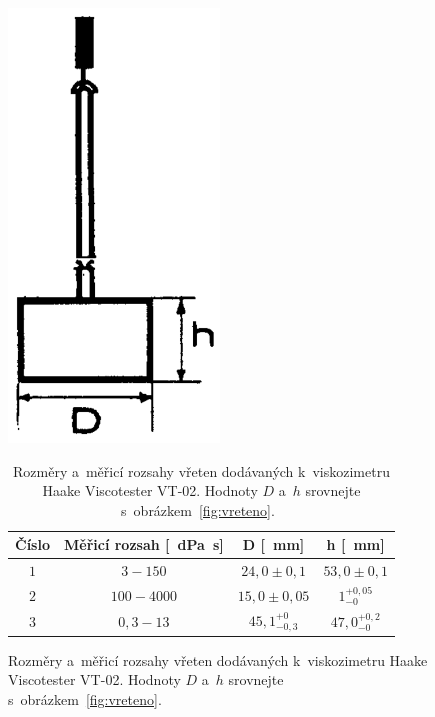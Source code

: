 \documentclass[12pt]{article}
\begin{document}
\begin{figure}[ht]
    \begin{minipage}[b]{0.3\linewidth}
        \centering
        \includegraphics[width=0.5\textwidth]{figures/vreteno.png}
        \caption{Obecný nákres rotačního vřetena.~\cite{man:VT-02}}
        \label{fig:vreteno}
    \end{minipage}
    \hspace{0.5cm}
    \begin{minipage}[b]{0.65\linewidth}
        \begin{table}[H]
            \centering
            \begin{tabular}{|c|c|c|c|}
                \hline
                Číslo & Měřicí rozsah [\SI{}{\deci\pascal\second}] & D [\SI{}{\milli\metre}] & h [\SI{}{\milli\metre}] \\ \hline
                $1$ & $3 - 150$ & $24,0\pm 0,1$ & $53,0\pm0,1$ \\ \hline
                $2$ & $100 - 4000$ & $15,0\pm 0,05$ & $1^{+0,05}_{-0}$ \\ \hline
                $3$ & $0,3 - 13$ & $45,1^{+0}_{-0,3}$ & $47,0^{+0,2}_{-0}$ \\ \hline
            \end{tabular}
            \caption{Rozměry a~měřicí rozsahy vřeten dodávaných k~viskozimetru Haake Viscotester VT-02. Hodnoty $D$ a~$h$ srovnejte s~obrázkem~\ref{fig:vreteno}.~\cite{man:VT-02}}
            \label{tab:vretena}
        \end{table}
        \label{fig:figure2}
    \end{minipage}
\end{figure}
\end{document}
